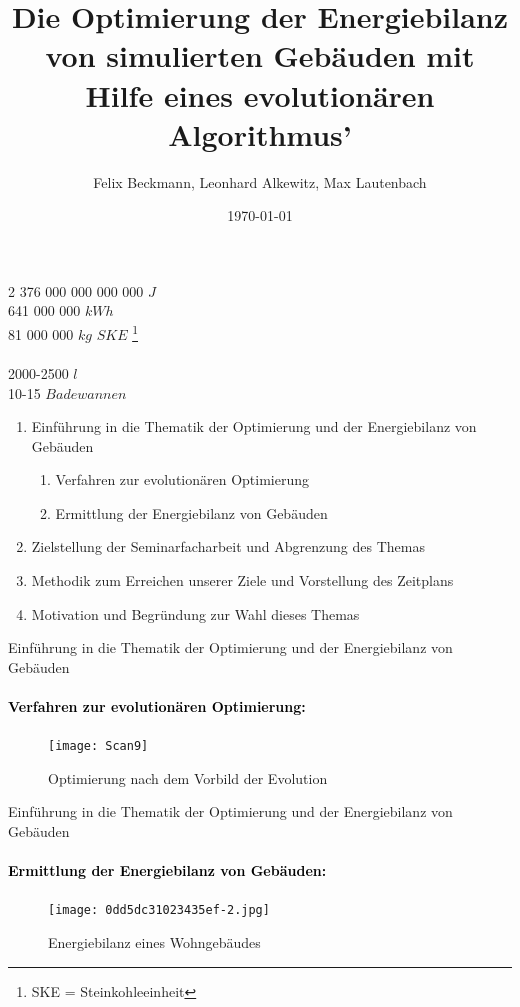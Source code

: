 \documentclass[11pt]{beamer}
\author{Felix Beckmann, Leonhard Alkewitz, Max Lautenbach}
\title{Die Optimierung der Energiebilanz von simulierten Gebäuden mit Hilfe eines evolutionären Algorithmus'}
\institute{Spezialschulteil des Albert-Schweizer Gymnasium Erfurt}
\date{\today}
\begin{document}
\begin{frame}

\end{frame}

\begin{frame}
\begin{center}
\huge{2 376 000 000 000 000 $J$}  \\  
\pause \huge{641 000 000 $kWh$} \\ 
\pause \huge{81 000 000 $kg$ $SKE$ \footnote{SKE = Steinkohleeinheit}} \\ 
\hrulefill{}  \\
\pause \huge{2000-2500 $l$} \\ 
\pause \huge{10-15 $Badewannen$}
\end{center}
\end{frame}

\begin{frame}
\titlepage
\end{frame}

\begin{frame}
\begin{enumerate}
\item{Einführung in die Thematik der Optimierung und der Energiebilanz von Gebäuden}
\begin{enumerate}
\item{Verfahren zur evolutionären Optimierung}
\item{Ermittlung der Energiebilanz von Gebäuden}
\end{enumerate}
\item{Zielstellung der Seminarfacharbeit und Abgrenzung des Themas}
\item{Methodik zum Erreichen unserer Ziele und Vorstellung des Zeitplans}
\item{Motivation und Begründung zur Wahl dieses Themas}
\end{enumerate}
\end{frame}

\begin{frame}{Einführung in die Thematik der Optimierung und der Energiebilanz von Gebäuden}
\framesubtitle{\large{\textcolor{black}{Verfahren zur evolutionären Optimierung:}}}
\begin{figure}
\texttt{[image: Scan9]}
\caption{Optimierung nach dem Vorbild der Evolution}
\end{figure}
\end{frame}

\begin{frame}{Einführung in die Thematik der Optimierung und der Energiebilanz von Gebäuden}
\framesubtitle{\large{\textcolor{black}{Ermittlung der Energiebilanz von Gebäuden:}}}
\begin{figure}
\texttt{[image: 0dd5dc31023435ef-2.jpg]} 
\caption{Energiebilanz eines Wohngebäudes}
\end{figure}
\end{frame}
\end{document}
